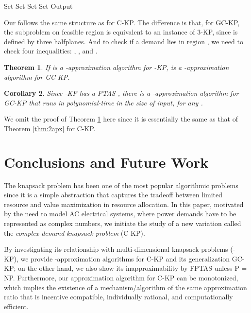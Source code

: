 \documentclass{aamas2013}
\newtheorem{theorem}{Theorem}[section]
\newtheorem{corollary}[theorem]{Corollary}
\begin{document}
\begin{algorithm}[htb!]
\caption{}
\begin{algorithmic}[1]
\FOR{} 
\STATE Set 
\ENDFOR
\STATE Set 
\STATE Set 
\STATE Set 
\STATE Output 
\end{algorithmic} 
\end{algorithm} 

Our  follows the same structure as  for C-KP.  The difference is that, for GC-KP, the subproblem on feasible region  is equivalent to an instance of 3-KP, since  is defined by three halfplanes.  And to check if a demand  lies in region , we need to check four inequalities: , ,  and . 

\begin{theorem} 
\label{thm:g2apx}
If  is a -approximation algorithm for {-KP},   is a -approximation algorithm for {\sc GC-KP}.
\end{theorem}

\begin{corollary}
\label{cor:g2apx}
Since {-KP} has a PTAS \cite{FC84alg}, there is a -approximation algorithm for {\sc GC-KP} that runs in polynomial-time in the size of input, for any .
\end{corollary}  


We omit the proof of Theorem \ref{thm:g2apx} here since it is essentially the same as that of Theorem \ref{thm:2apx} for C-KP.  


\section{Conclusions and Future Work}\label{sec:conc}
\noindent
The knapsack problem has been one of the most popular algorithmic problems since it is a simple abstraction that captures the tradeoff between limited resource and value maximization in resource allocation.  In this paper, motivated by the need to model AC electrical systems, where power demands have to be represented as complex numbers, we initiate the study of a new variation called the {\em complex-demand knapsack problem} (C-KP).  

By investigating its relationship with multi-dimensional knapsack problems (-KP), we provide -approximation algorithms for C-KP and its generalization GC-KP; on the other hand, we also show its inapproximability by FPTAS unless P = NP.  Furthermore, our approximation algorithm for C-KP can be monotonized, which implies the existence of a mechanism/algorithm of the same approximation ratio that is incentive compatible, individually rational, and computationally efficient.                
\end{document}
